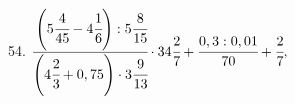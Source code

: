 54. $\cfrac{\left(5\cfrac{4}{45}-4\cfrac{1}{6}\right):5\cfrac{8}{15}}{\left(4\cfrac{2}{3}+0,75\right)\cdot3\cfrac{9}{13}}\cdot34\cfrac{2}{7}+\cfrac{0,3:0,01}{70}+\cfrac{2}{7},$\quad
